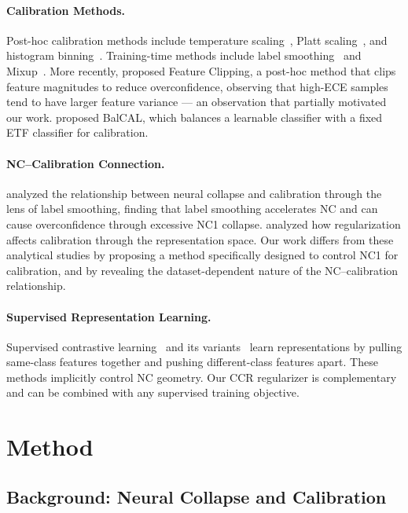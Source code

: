 \documentclass{article}
\begin{document}
\paragraph{Calibration Methods.}
Post-hoc calibration methods include temperature scaling~\citep{guo2017calibration}, Platt scaling~\citep{platt1999probabilistic}, and histogram binning~\citep{zadrozny2001obtaining}. Training-time methods include label smoothing~\citep{szegedy2016rethinking, muller2019does} and Mixup~\citep{zhang2018mixup}. More recently, \citet{tao2025feature} proposed Feature Clipping, a post-hoc method that clips feature magnitudes to reduce overconfidence, observing that high-ECE samples tend to have larger feature variance --- an observation that partially motivated our work. \citet{ni2025balancing} proposed BalCAL, which balances a learnable classifier with a fixed ETF classifier for calibration.

\paragraph{NC--Calibration Connection.}
\citet{guo2025cross} analyzed the relationship between neural collapse and calibration through the lens of label smoothing, finding that label smoothing accelerates NC and can cause overconfidence through excessive NC1 collapse. \citet{park2024impact} analyzed how regularization affects calibration through the representation space. Our work differs from these analytical studies by proposing a method specifically designed to control NC1 for calibration, and by revealing the dataset-dependent nature of the NC--calibration relationship.

\paragraph{Supervised Representation Learning.}
Supervised contrastive learning~\citep{khosla2020supervised} and its variants~\citep{wang2025variational} learn representations by pulling same-class features together and pushing different-class features apart. These methods implicitly control NC geometry. Our CCR regularizer is complementary and can be combined with any supervised training objective.

\section{Method}
\label{sec:method}

\subsection{Background: Neural Collapse and Calibration}
\end{document}
